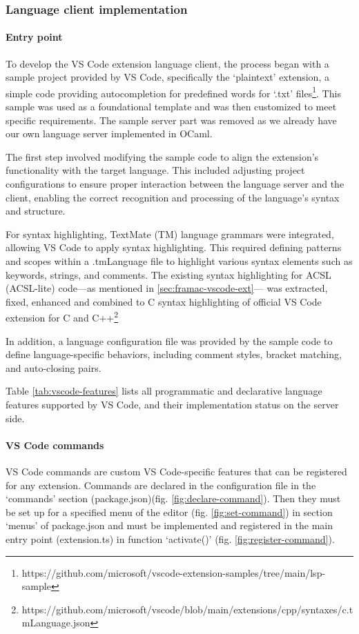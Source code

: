 \documentclass[10pt]{article}
\begin{document}
\begin{singlespace}
\subsubsection{Language client implementation} 
\paragraph*{Entry point}
To develop the VS Code extension language client, the process began with a sample project provided by VS Code, specifically the `plaintext' extension, a simple code providing autocompletion for predefined words for `.txt' files\footnote{https://github.com/microsoft/vscode-extension-samples/tree/main/lsp-sample}. This sample was used as a foundational template and was then customized to meet specific requirements. The sample server part was removed as we already have our own language server implemented in OCaml.

The first step involved modifying the sample code to align the extension's functionality with the target language. This included adjusting project configurations to ensure proper interaction between the language server and the client, enabling the correct recognition and processing of the language's syntax and structure.

For syntax highlighting, TextMate (TM) language grammars were integrated, allowing VS Code to apply syntax highlighting. This required defining patterns and scopes within a .tmLanguage file to highlight various syntax elements such as keywords, strings, and comments. The existing syntax highlighting for ACSL (ACSL-lite) code---as mentioned in \ref{sec:framac-vscode-ext}--- was extracted, fixed, enhanced and combined to C syntax highlighting of official VS Code extension for C and C++\footnote{https://github.com/microsoft/vscode/blob/main/extensions/cpp/syntaxes/c.tmLanguage.json} 

In addition, a language configuration file was provided by the sample code to define language-specific behaviors, including comment styles, bracket matching, and auto-closing pairs.

Table \ref{tab:vscode-features} lists all programmatic and declarative language features supported by VS Code, and their implementation status on the server side.

\paragraph*{VS Code commands}
VS Code commands are custom VS Code-specific features that can be registered for any extension. Commands are declared in the configuration file in the `commands' section (package.json)(fig. \ref{fig:declare-command}). Then they must be set up for a specified menu of the editor (fig. \ref{fig:set-command}) in section `menus' of package.json and must be implemented and registered in the main entry point (extension.ts) in function `activate()' (fig. \ref{fig:register-command}).


\end{singlespace}
\end{document}
